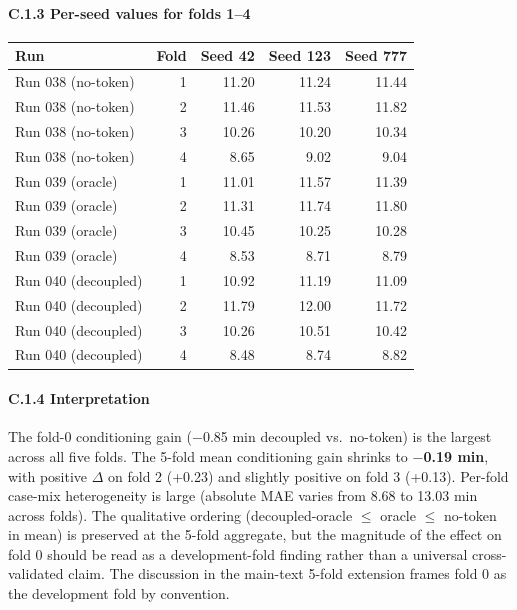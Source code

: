 \paragraph{C.1.3 Per-seed values for folds
1--4}\label{c.1.3-per-seed-values-for-folds-14}

\begin{longtable}[]{@{}lrrrr@{}}
\toprule\noalign{}
Run & Fold & Seed 42 & Seed 123 & Seed 777 \\
\midrule\noalign{}
\endhead
\bottomrule\noalign{}
\endlastfoot
Run 038 (no-token) & 1 & 11.20 & 11.24 & 11.44 \\
Run 038 (no-token) & 2 & 11.46 & 11.53 & 11.82 \\
Run 038 (no-token) & 3 & 10.26 & 10.20 & 10.34 \\
Run 038 (no-token) & 4 & 8.65 & 9.02 & 9.04 \\
Run 039 (oracle) & 1 & 11.01 & 11.57 & 11.39 \\
Run 039 (oracle) & 2 & 11.31 & 11.74 & 11.80 \\
Run 039 (oracle) & 3 & 10.45 & 10.25 & 10.28 \\
Run 039 (oracle) & 4 & 8.53 & 8.71 & 8.79 \\
Run 040 (decoupled) & 1 & 10.92 & 11.19 & 11.09 \\
Run 040 (decoupled) & 2 & 11.79 & 12.00 & 11.72 \\
Run 040 (decoupled) & 3 & 10.26 & 10.51 & 10.42 \\
Run 040 (decoupled) & 4 & 8.48 & 8.74 & 8.82 \\
\end{longtable}

\paragraph{C.1.4 Interpretation}\label{c.1.4-interpretation}

The fold-0 conditioning gain ($-$0.85 min decoupled vs.~no-token) is the
largest across all five folds. The 5-fold mean conditioning gain shrinks
to \textbf{$-$0.19 min}, with positive $\Delta$ on fold 2 (+0.23) and slightly
positive on fold 3 (+0.13). Per-fold case-mix heterogeneity is large
(absolute MAE varies from 8.68 to 13.03 min across folds). The
qualitative ordering (decoupled-oracle $\leq$ oracle $\leq$ no-token in mean) is
preserved at the 5-fold aggregate, but the magnitude of the effect on
fold 0 should be read as a development-fold finding rather than a
universal cross-validated claim. The discussion in the main-text 5-fold extension frames fold 0
as the development fold by convention.

